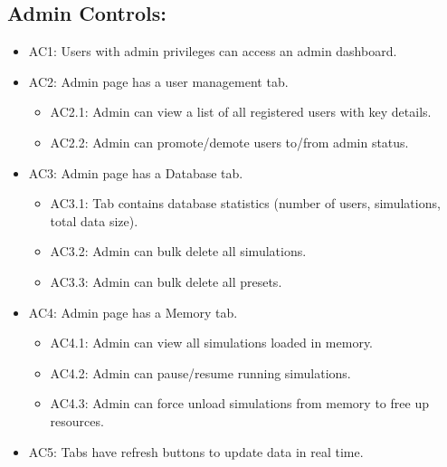     \subsection{Admin Controls:}
\begin{itemize}
    \item\label{req:AC1} AC1: Users with admin privileges can access an admin dashboard.
    \item\label{req:AC2} AC2: Admin page has a user management tab.
    \begin{itemize}
        \item\label{req:AC2.1} AC2.1: Admin can view a list of all registered users with key details.
        \item\label{req:AC2.2} AC2.2: Admin can promote/demote users to/from admin status.
    \end{itemize}
    \item\label{req:AC3} AC3: Admin page has a Database tab.
    \begin{itemize}
        \item\label{req:AC3.1} AC3.1: Tab contains database statistics (number of users, simulations, total data size).
        \item\label{req:AC3.2} AC3.2: Admin can bulk delete all simulations.
        \item\label{req:AC3.3} AC3.3: Admin can bulk delete all presets.
    \end{itemize}
    \item\label{req:AC4} AC4: Admin page has a Memory tab.
    \begin{itemize}
        \item\label{req:AC4.1} AC4.1: Admin can view all simulations loaded in memory.
        \item\label{req:AC4.2} AC4.2: Admin can pause/resume running simulations.
        \item\label{req:AC4.3} AC4.3: Admin can force unload simulations from memory to free up resources.
    \end{itemize}
    \item\label{req:AC5} AC5: Tabs have refresh buttons to update data in real time.
\end{itemize}


